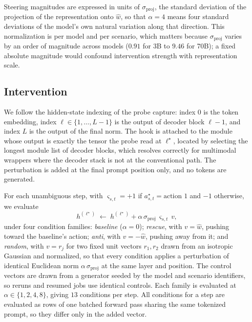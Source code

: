 Steering magnitudes are expressed in units of \(\sigma_{\mathrm{proj}}\), the
standard deviation of the projection of the representation onto \(\hat w\), so
that \(\alpha=4\) means four standard deviations of the model's own natural
variation along that direction. This normalization is per model and per
scenario, which matters because \(\sigma_{\mathrm{proj}}\) varies by an order of
magnitude across models (\(0.91\) for  3B to \(9.46\) for
 70B); a fixed absolute magnitude would confound intervention
strength with representation scale.

\subsection{Intervention}

We follow the hidden-state indexing of the probe capture: index \(0\) is the
token embedding, index \(\ell\in\{1,\ldots,L-1\}\) is the output of decoder
block \(\ell-1\), and index \(L\) is the output of the final norm. The hook is
attached to the module whose output is exactly the tensor the probe read at
\(\ell^\star\), located by selecting the longest module list of decoder blocks,
which resolves correctly for multimodal wrappers where the decoder stack is not
at the conventional path. The perturbation is added at the final prompt
position only, and no tokens are generated.

For each unambiguous step, with \(\varsigma_{s,t}=+1\) if
\(a^\star_{s,t}=\text{action }1\) and \(-1\) otherwise, we evaluate
\begin{equation}
h^{(\ell^\star)}
\;\leftarrow\;
h^{(\ell^\star)}
+
\alpha\,\sigma_{\mathrm{proj}}\,\varsigma_{s,t}\,v,
\end{equation}
under four condition families:
\emph{baseline} (\(\alpha=0\));
\emph{rescue}, with \(v=\hat w\), pushing toward the baseline's action;
\emph{anti}, with \(v=-\hat w\), pushing away from it; and
\emph{random}, with \(v=r_j\) for two fixed unit vectors
\(r_1,r_2\) drawn from an isotropic Gaussian and normalized, so that every
condition applies a perturbation of identical Euclidean norm
\(\alpha\,\sigma_{\mathrm{proj}}\) at the same layer and position. The control
vectors are drawn from a generator seeded by the model and scenario identifiers,
so reruns and resumed jobs use identical controls. Each family is evaluated at
\(\alpha\in\{1,2,4,8\}\), giving \(13\) conditions per step. All conditions for
a step are evaluated as rows of one batched forward pass sharing the same
tokenized prompt, so they differ only in the added vector.

